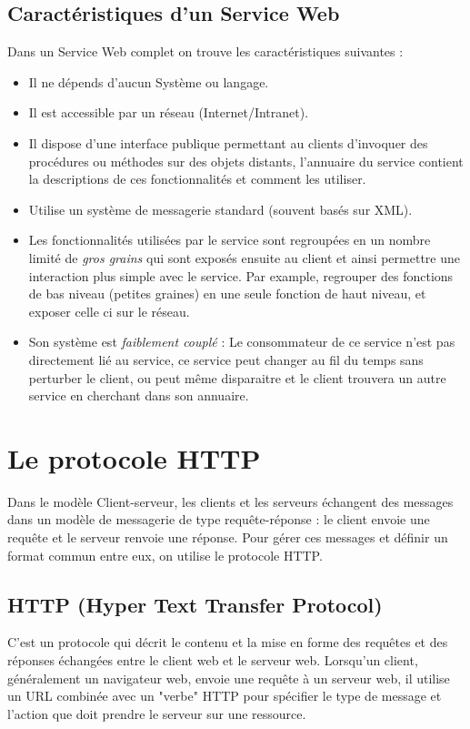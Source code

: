 \subsection{Caractéristiques d'un Service Web}
Dans un Service Web complet on trouve les caractéristiques suivantes :\cite{refTutorialPointsWS}
\begin{itemize}
	\item Il ne dépends d'aucun Système ou langage.
	\item Il est accessible par un réseau (Internet/Intranet).
	\item Il dispose d'une interface publique permettant au clients d'invoquer des procédures ou méthodes sur des objets distants, l'annuaire du service contient la descriptions de ces fonctionnalités et comment les utiliser.
	\item Utilise un système de messagerie standard (souvent basés sur XML).
	\item Les fonctionnalités utilisées par le service sont regroupées en un nombre limité de \emph{gros grains} qui sont exposés ensuite au client et ainsi permettre une interaction plus simple avec le service. Par example, regrouper des fonctions de bas niveau (petites graines) en une seule fonction de haut niveau, et exposer celle ci sur le réseau.
	\item Son système est \emph{faiblement couplé} : Le consommateur de ce service n'est pas directement lié au service, ce service peut changer au fil du temps sans perturber le client, ou peut même disparaitre et le client trouvera un autre service en cherchant dans son annuaire.
\end{itemize}
		
\newpage
\section{Le protocole HTTP}
Dans le modèle Client-serveur, les clients et les serveurs échangent des messages dans un modèle de messagerie de type requête-réponse : le client envoie une requête et le serveur renvoie une réponse.
Pour gérer ces messages et définir un format commun entre eux, on utilise le protocole HTTP.

\subsection{HTTP (Hyper Text Transfer Protocol)}
C'est un protocole qui décrit le contenu et la mise en forme des requêtes et des réponses échangées entre le client web et le serveur web. 
Lorsqu'un client, généralement un navigateur web, envoie une requête à un serveur web, il utilise un URL combinée avec un "verbe" HTTP pour spécifier le type de message et l'action que doit prendre le serveur sur une ressource.

